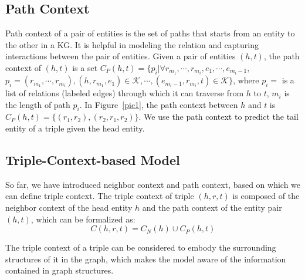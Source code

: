 \subsection{Path Context}
Path context of a pair of entities is the set of paths that starts from an entity to the other in a KG. It is helpful in modeling the relation and capturing interactions between the pair of entities. Given a pair of entities $(h,t)$, the path context of $(h,t)$ is a set $C_P(h,t)=\{p_i | \forall r_{m_1}, \cdots, r_{m_i}, e_1, \cdots, e_{m_i-1},$ $p_i=(r_{m_1}, \cdots, r_{m_i}), (h,r_{m_1},e_1)\in\mathcal{K}, \cdots, (e_{m_i-1}, r_{m_i}, t)\in\mathcal{K}\}$, where $p_i=$ is a list of relations (labeled edges) through which it can traverse from $h$ to $t$, $m_i$ is the length of path $p_i$. In Figure~\ref{pic1}, the path context between $h$ and $t$ is $C_P(h,t) = \{(r_1, r_2), (r_2, r_1, r_2)\}$. We use the path context to predict the tail entity of a triple given the head entity.


\subsection{Triple-Context-based Model}
\begin{comment}
In general, a KG embedding model defines a score function for evaluating the confidence of a triple, and optimize an objective function constructed from the score function. For example, TransE wants $\bm{\mathrm{h}} + \bm{\mathrm{r}} \approx \bm{\mathrm{t}}$ when $(h,r,t)$ holds, so it defines the score function as
\begin{equation}\label{TransE_score_function}
  f(h,r,t)=\|\bm{\mathrm{h}} + \bm{\mathrm{r}} -\bm{\mathrm{t}}\|
\end{equation}
which is negative correlation with the confidence of a triple. It could be either the $L_1$ or the $L_2$ norm.\end{comment}
So far, we have introduced neighbor context and path context, based on which we can define triple context. The triple context of triple $(h,r,t)$ is composed of the neighbor context of the head entity $h$ and the path context of the entity pair $(h,t)$, which can be formalized as:
\begin{equation}\label{triple context}
  C(h,r,t) = C_N(h) \cup C_P(h, t)
\end{equation}

The triple context of a triple can be considered to embody the surrounding structures of it in the graph, which makes the model aware of the information contained in graph structures.

